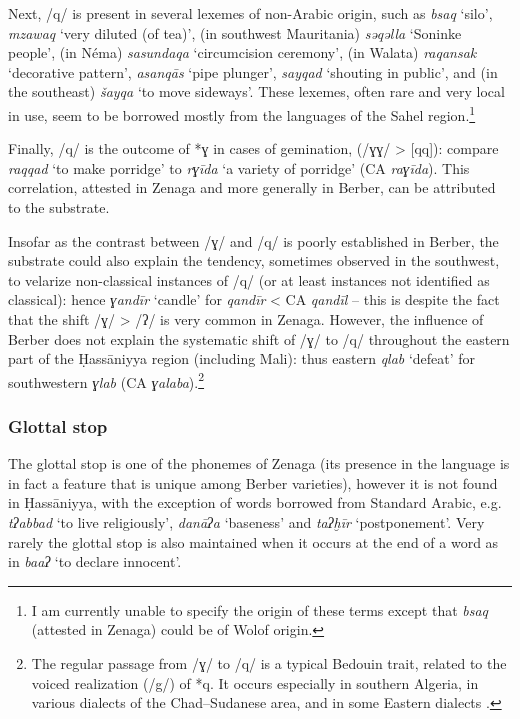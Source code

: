 \documentclass[output=paper]{langsci/langscibook}
\begin{document}
Next, /q/ is present in several lexemes of non-Arabic origin, such as \textit{bsaq} ‘silo’, \textit{mzaw{\R}aq} ‘very diluted (of tea)’, (in southwest Mauritania) \textit{sə{\R}qəlla} ‘Soninke people’, (in Néma) \textit{sasundaqa} ‘circumcision ceremony’, (in Walata) \textit{raqansak} ‘decorative pattern’, \textit{asanqās} ‘pipe plunger’, \textit{sayqad} ‘shouting in public’, and (in the southeast) \textit{šayqa} ‘to move sideways’. These lexemes, often rare and very local in use, seem to be borrowed mostly from the languages of the Sahel region.\footnote{I am currently unable to specify the origin of these terms except that \textit{bsaq} (attested in Zenaga) could be of Wolof origin.}

Finally, /q/ is the outcome of *ɣ in cases of gemination, (/ɣɣ/ > [qq]): compare \textit{raqqad} ‘to make porridge’ to \textit{rɣīda} ‘a variety of porridge’ (CA \textit{raɣīda}). This correlation, attested in Zenaga and more generally in Berber, can be attributed to the substrate.

Insofar as the contrast between /ɣ/ and /q/ is poorly established in Berber, the substrate could also explain the tendency, sometimes observed in the southwest, to velarize non-classical instances of /q/ (or at least instances not identified as classical): hence \textit{ɣandīr} ‘candle’ for \textit{qandīr} < CA \textit{qandīl} – this is despite the fact that the shift /ɣ/ > /ʔ/ is very common in Zenaga. However, the influence of Berber does not explain the systematic shift of /ɣ/ to /q/ throughout the eastern part of the Ḥassāniyya region (including Mali): thus eastern \textit{qlab} ‘defeat’ for southwestern \textit{ɣlab} (CA \textit{ɣalaba}).\footnote{The regular passage from /ɣ/ to /q/ is a typical Bedouin trait, related to the voiced realization (/g/) of *q. It occurs especially in southern Algeria, in various dialects of the Chad–Sudanese area, and in some Eastern dialects \citep[72]{Cantineau1960book}.}

\subsubsection{ Glottal stop} %
The glottal stop is one of the phonemes of Zenaga (its presence in the language is in fact a feature that is unique among Berber varieties), however it is not found in Ḥassāniyya, with the exception of words borrowed from Standard Arabic, e.g. \textit{tʔabbad} ‘to live religiously’, \textit{danāʔa} ‘baseness’ and \textit{taʔḫīr} ‘postponement’. Very rarely the glottal stop is also maintained when it occurs at the end of a word as in \textit{ba{\R}{\R}aʔ} ‘to declare innocent’.
\end{document}
